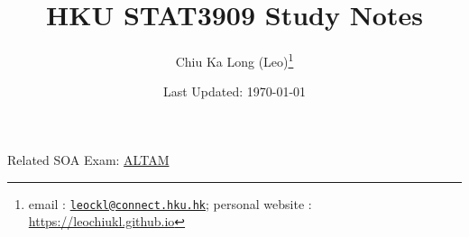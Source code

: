 \documentclass{article}
\begin{document}
\title{HKU STAT3909 Study Notes}
\author{Chiu Ka Long (Leo)\thanks{
email :
\href{mailto:leockl@connect.hku.hk}{\texttt{leockl@connect.hku.hk}};
personal website :
\url{https://leochiukl.github.io}
}}
\date{Last Updated: \today}
\maketitle
\doclicenseThis
\begin{note}
Related SOA Exam:
\href{https://www.soa.org/education/exam-req/edu-exam-altam/}{ALTAM}
\end{note}
\tableofcontents





\printbibliography

\end{document}
